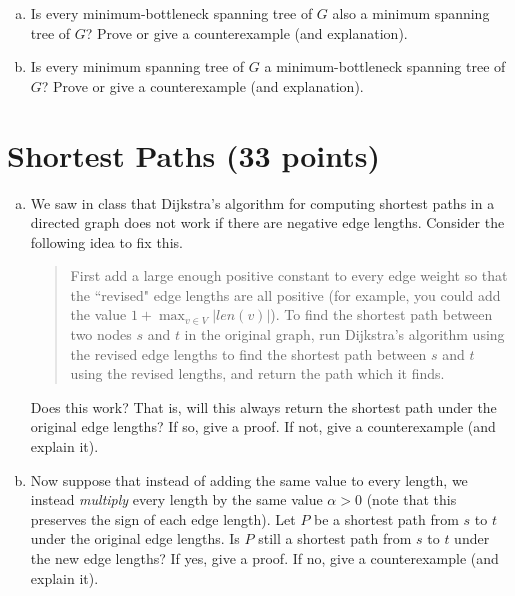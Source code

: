 \documentclass{article}
\begin{document}
\begin{enumerate}[(a), resume]
\item Is every minimum-bottleneck spanning tree of $G$ also a minimum spanning tree of $G$?  Prove or give a counterexample (and explanation).
\item Is every minimum spanning tree of $G$ a minimum-bottleneck spanning tree of $G$?  Prove or give a counterexample (and explanation).
\end{enumerate}

\section{Shortest Paths (33 points)}
\begin{enumerate}[(a)]
\item We saw in class that Dijkstra's algorithm for computing shortest paths in a directed graph does not work if there are negative edge lengths.  Consider the following idea to fix this.
\begin{quote}
First add a large enough positive constant to every edge weight so that the ``revised" edge lengths are all positive (for example, you could add the value $1 + \max_{v \in V} |len(v)|$).  To find the shortest path between two nodes $s$ and $t$ in the original graph, run Dijkstra's algorithm using the revised edge lengths to find the shortest path between $s$ and $t$ using the revised lengths, and return the path which it finds.
\end{quote}
Does this work?  That is, will this always return the shortest path under the original edge lengths?  If so, give a proof.  If not, give a counterexample (and explain it). 

\item Now suppose that instead of adding the same value to every length, we instead \emph{multiply} every length by the same value $\alpha > 0$ (note that this preserves the sign of each edge length).  Let $P$ be a shortest path from $s$ to $t$ under the original edge lengths.  Is $P$ still a shortest path from $s$ to $t$ under the new edge lengths?  If yes, give a proof.  If no, give a counterexample (and explain it).  

\end{enumerate}
\end{document}
